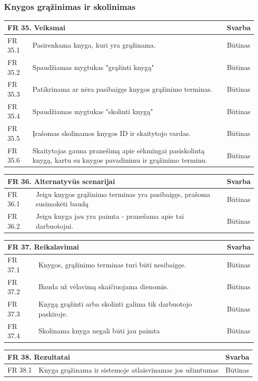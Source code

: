 \documentclass{VUMIFPSkursinis}
\begin{document}
\subsubsection{Knygos grąžinimas ir skolinimas}
\noindent
 \vspace{5mm}
 \begin{tabular}{ | p{} | p{} | p{} |}
    \hline
        \multicolumn{2}{|l|}{   FR 35. Veiksmai} &Svarba  \\ \hline 
FR 35.1& Pasirenkama knyga, kuri yra grąžinama.& Būtinas\\ \hline
 FR 35.2& Spaudžiamas mygtukas "grąžinti knygą"& Būtinas\\ \hline
FR 35.3& Patikrinama ar nėra pasibaigęs knygos grąžinimo terminas.& Būtinas\\ \hline
FR 35.4& Spaudžiamas mygtukas "skolinti knygą"& Būtinas\\ \hline
FR 35.5& Įrašomas skolinamos knygos ID ir skaitytojo vardas.& Būtinas\\ \hline
FR 35.6& Skaitytojas gauna pranešimą apie sėkmingai pasiskolintą knygą, kartu su knygos pavadinimu ir grąžinimo terminu.& Būtinas\\ \hline
    \end{tabular}
    \vspace{5mm}  
 \begin{tabular}{ | p{} | p{} | p{} |}
    \hline
   \multicolumn{2}{|l|}{  FR 36. Alternatyvūs scenarijai} &Svarba  \\ \hline 
   FR 36.1& Jeigu knygos grąžinimo terminas yra pasibaigęs, prašoma susimokėti baudą&  Būtinas\\ \hline
   FR 36.2& Jeigu knyga jau yra paimta - pranešama apie tai darbuotojui.&  Būtinas\\ \hline
    \end{tabular}
 \vspace{5mm}
    \begin{tabular}{ | p{} | p{} | p{} |}
    \hline
     \multicolumn{2}{|l|}{   FR 37. Reikalavimai} &Svarba  \\ \hline 
FR 37.1  &Knygos, grąžinimo terminas turi būti nesibaigęs.& Būtinas \\ \hline
FR 37.2 &Bauda už vėlavimą skaičiuojama dienomis.&Būtinas\\ \hline
FR 37.3&  Knygą grąžinti arba skolinti galima tik darbuotojo paskiroje. &Būtinas\\ \hline
FR 37.4&  Skolinama knyga negali būti jau paimta &Būtinas\\ \hline
    \end{tabular}
    \vspace{5mm}
     \begin{tabular}{ | p{} | p{} | p{} |}
    \hline
     \multicolumn{2}{|l|}{ FR 38. Rezultatai } &Svarba  \\ \hline 
 FR 38.1& Knyga grąžinama ir sistemoje atlaisvinamas jos užimtumas& Būtinas\\ \hline

    \end{tabular}
 
\end{document}
